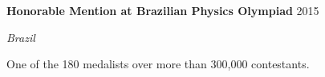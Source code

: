 \documentclass[letterpaper,10pt]{article}
\newcommand{\entry}[4]{

\begin{minipage}[t]{.15\textwidth}
\end{minipage}
\hfill\vline\hfill 
\begin{minipage}[t]{0.95\textwidth}
#2 \hfill \textsc{#1}

\textit{#3}

\footnotesize{#4}
\end{minipage}\\\vspace{.25cm}}
\newcommand{\mycomment}[1]{}
\begin{document}
\entry{2015}{\textbf{Honorable Mention at Brazilian Physics Olympiad}}{Brazil}{
	One of the 180 medalists over more than 300,000 contestants.
}
\vspace*{-.25cm}

\end{document}
